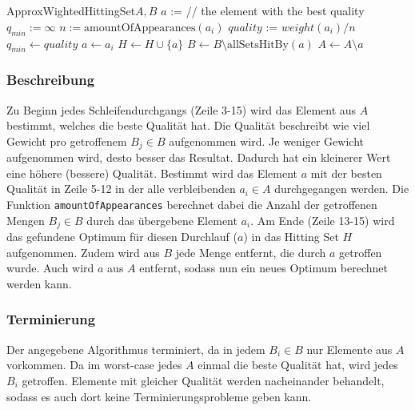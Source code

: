 \documentclass[a4paper]{article}
\begin{document}
	\maketitle
	\section{}
		\begin{pseudocode}{ApproxWightedHittingSet}{$A, B$}
					\State $a$ := \Null \hfill // the element with the best quality
					\State $q_{min}:=\infty$
						\State $n := \text{amountOfAppearances}(a_i)$
						\State $quality$ := $weight(a_i) / n$
							\State $q_{min}\gets quality$
							\State $a\gets a_i$
						\EndIf
					\EndFor
					\State $H\gets H\cup \{a\}$
					\State $B\gets B\setminus\text{allSetsHitBy}(a)$
					\State $A\gets A\setminus a$
				\EndWhile
			\EndProcedure
		\end{pseudocode}
		\subsubsection*{Beschreibung}
		Zu Beginn jedes Schleifendurchgangs (Zeile 3-15) wird das Element aus $A$ bestimmt, welches die beste Qualität hat.
		Die Qualität beschreibt wie viel Gewicht pro getroffenem $B_j\in B$ aufgenommen wird.
		Je weniger Gewicht aufgenommen wird, desto besser das Resultat. Dadurch hat ein kleinerer Wert eine höhere (bessere) Qualität.\n
		Bestimmt wird das Element $a$ mit der besten Qualität in Zeile 5-12 in der alle verbleibenden $a_i\in A$ durchgegangen werden.
		Die Funktion \texttt{amountOfAppearances} berechnet dabei die Anzahl der getroffenen Mengen $B_j\in B$ durch das übergebene Element $a_i$.\n
		Am Ende (Zeile 13-15) wird das gefundene Optimum für diesen Durchlauf ($a$) in das Hitting Set $H$ aufgenommen.
		Zudem wird aus $B$ jede Menge entfernt, die durch $a$ getroffen wurde.
		Auch wird $a$ aus $A$ entfernt, sodass nun ein neues Optimum berechnet werden kann.
		\subsubsection*{Terminierung}
		Der angegebene Algorithmus terminiert, da in jedem $B_i\in B$ nur Elemente aus $A$ vorkommen. Da im worst-case jedes $A$ einmal die beste Qualität hat, wird jedes $B_i$ getroffen. Elemente mit gleicher Qualität werden nacheinander behandelt, sodass es auch dort keine Terminierungsprobleme geben kann.
\end{document}
